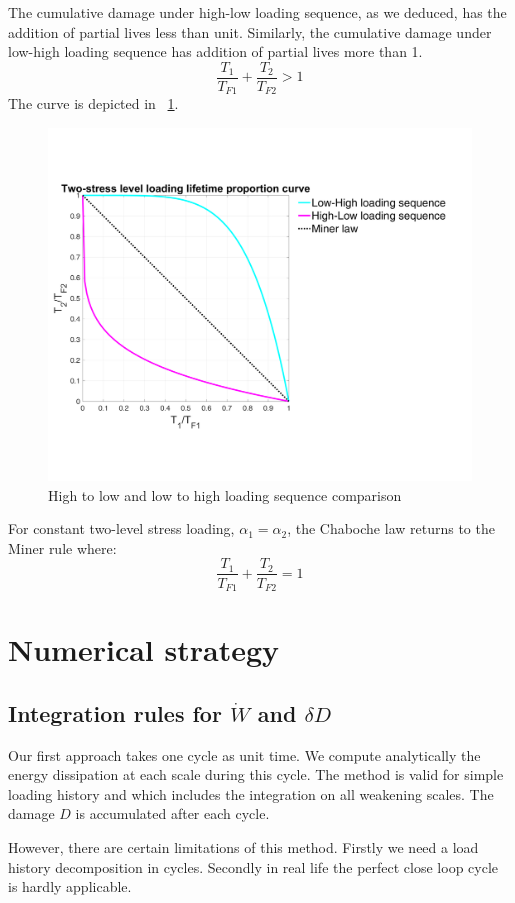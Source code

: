 \documentclass[3p,times,number,review]{elsarticle}
\newcommand{\figref}[1]{\figurename~\ref{#1}}
\begin{document}
The cumulative damage under high-low loading sequence, as we deduced, has the addition of partial lives less than unit. Similarly, the cumulative damage under low-high loading sequence has addition of partial lives more than 1.
$$\frac{T_1}{T_{F1}}+\frac{T_2}{T_{F2}}>1$$
 The curve is depicted in \figref{fig.sequence}.
\begin{figure}[!h]
	\centering
	\includegraphics[width=\textwidth]{figures//sequence.png} 
	\caption{High to low and low to high loading sequence comparison}
	\label{fig.sequence}
\end{figure}
For constant two-level stress loading, $\alpha_1=\alpha_2$, the Chaboche law returns to the Miner rule where:
$$\frac{T_1}{T_{F1}}+\frac{T_2}{T_{F2}}=1$$

\section{Numerical strategy}
\subsection{Integration rules for $\dot{W}$ and $\delta D$}
Our first approach takes one cycle as unit time. We compute analytically the energy dissipation at each scale during this cycle. The method is valid for simple loading history and which includes the integration on all weakening scales. The damage $D$ is accumulated after each cycle.

However, there are certain limitations of this method. Firstly we need a load history decomposition in cycles. Secondly in real life the perfect close loop cycle is hardly applicable.
\end{document}
